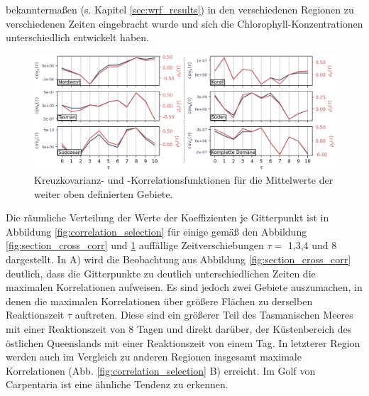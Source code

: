 \documentclass[12pt,a4paper,onecolumn]{scrartcl}
\begin{document}
bekanntermaßen (s. Kapitel \ref{sec:wrf_results}) in den verschiedenen Regionen zu verschiedenen Zeiten eingebracht wurde und sich die Chlorophyll-Konzentrationen unterschiedlich entwickelt haben.
\begin{figure}[!htb]
\includegraphics[width=\textwidth]{bilder/section_means_crosscorr_noadv.png}
\caption{Kreuzkovarianz- und -Korrelationsfunktionen für die Mittelwerte der weiter oben definierten Gebiete.} \label{fig:section_means_cross_corr}
\end{figure}
Die räumliche Verteilung der Werte der Koeffizienten je Gitterpunkt ist in Abbildung \ref{fig:correlation_selection} für einige gemäß den Abbildung \ref{fig:section_cross_corr} und \ref{fig:section_means_cross_corr} auffällige Zeitverschiebungen $\tau=$ 1,3,4 und 8 dargestellt. In A) wird die Beobachtung aus Abbildung \ref{fig:section_cross_corr} deutlich, dass die Gitterpunkte zu deutlich unterschiedlichen Zeiten die maximalen Korrelationen aufweisen. Es sind jedoch zwei Gebiete auszumachen, in denen die maximalen Korrelationen über größere Flächen zu derselben Reaktionszeit $\tau$ auftreten. Diese sind ein größerer Teil des Tasmanischen Meeres mit einer Reaktionszeit von 8 Tagen und direkt darüber, der Küstenbereich des östlichen Queenslands mit einer Reaktionszeit von einem Tag. In letzterer Region werden auch im Vergleich zu anderen Regionen insgesamt maximale Korrelationen (Abb. \ref{fig:correlation_selection} B) erreicht. Im Golf von Carpentaria ist eine ähnliche Tendenz zu erkennen. 
\end{document}
